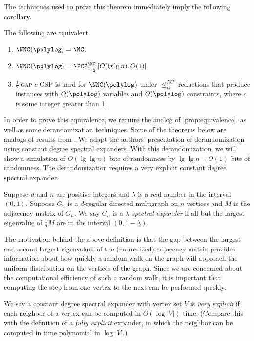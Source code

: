 \documentclass[]{article}
\newcommand{\PCPcs}[5]{\PCP^{#1}_{#2, #3}\left[#4, #5\right]}
\begin{document}
The techniques used to prove this theorem immediately imply the following corollary.

\begin{corollary}
  The following are equivalent.
  \begin{enumerate}
  \item $\NNC(\polylog) = \NC$.
  \item $\NNC(\polylog) = \PCPcs{\NC}{1}{\frac{1}{2}}{O(\lg \lg n)}{O(1)}$.
  \item \textsc{$\frac{1}{2}$-gap $c$-CSP} is hard for $\NNC(\polylog)$ under $\leq_m^{NC}$ reductions that produce instances with $O(\polylog)$ variables and $O(\polylog)$ constraints, where $c$ is some integer greater than 1.
  \end{enumerate}
\end{corollary}

In order to prove this equivalence, we require the \NC{} analog of \autoref{prop:equivalence}, as well as some derandomization techniques.
Some of the theorems below are \NC{} analogs of results from \cite{fs96}.
We adapt the authors' presentation of derandomization using constant degree spectral expanders.
With this derandomization, we will show a simulation of $O(\lg \lg n)$ bits of randomness by $\lg \lg n + O(1)$ bits of randomness.
The derandomization requires a very explicit constant degree spectral expander.

\begin{definition}
  Suppose $d$ and $n$ are positive integers and $\lambda$ is a real number in the interval $(0, 1)$.
  Suppose $G_n$ is a $d$-regular directed multigraph on $n$ vertices and $M$ is the adjacency matrix of $G_n$.
  We say $G_n$ is a \emph{$\lambda$ spectral expander} if all but the largest eigenvalue of $\frac{1}{d}M$ are in the interval $(0, 1 - \lambda)$.
\end{definition}

The motivation behind the above definition is that the gap between the largest and second largest eigenvalues of the (normalized) adjacency matrix provides information about how quickly a random walk on the graph will approach the uniform distribution on the vertices of the graph.
Since we are concerned about the computational efficiency of such a random walk, it is important that computing the step from one vertex to the next can be performed quickly.

\begin{definition}
  We say a constant degree spectral expander with vertex set $V$ is \emph{very explicit} if each neighbor of a vertex can be computed in $O(\log |V|)$ time.
  (Compare this with the definition of a \emph{fully explicit} expander, in which the neighbor can be computed in time polynomial in $\log |V|$.)
\end{definition}
\end{document}
